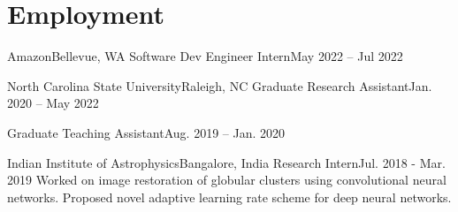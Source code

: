 \section{Employment}
  \resumeSubHeadingListStart
    \resumeSubheading
      {Amazon}{Bellevue, WA}
      {Software Dev Engineer Intern}{May 2022 -- Jul 2022}
      \resumeItemListStart
      \resumeItemListEnd

    \resumeSubheading
      {North Carolina State University}{Raleigh, NC}
      {Graduate Research Assistant}{Jan. 2020 -- May 2022}
      \resumeItemListStart
      \resumeItemListEnd
      
    \addExtraPosition
      {Graduate Teaching Assistant}{Aug. 2019 -- Jan. 2020}
      \resumeItemListStart
      \resumeItemListEnd

    \resumeSubheading
      {Indian Institute of Astrophysics}{Bangalore, India}
      {Research Intern}{Jul. 2018 - Mar. 2019}
      \resumeItemListStart
          {Worked on image restoration of globular clusters using convolutional neural networks.}
          {Proposed novel adaptive learning rate scheme for deep neural networks.}
      \resumeItemListEnd
      
  \resumeSubHeadingListEnd
